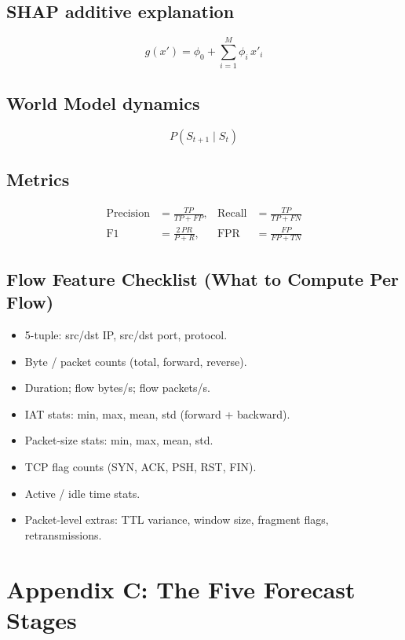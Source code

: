 \documentclass[11pt,a4paper]{article}
\begin{document}
\subsection*{SHAP additive explanation}
\begin{equation*}
g(x') = \phi_0 + \sum_{i=1}^{M} \phi_i \, x'_i
\end{equation*}

\subsection*{World Model dynamics}
\begin{equation*}
P(S_{t+1} \mid S_t)
\end{equation*}

\subsection*{Metrics}
\begin{align*}
\text{Precision} &= \frac{TP}{TP+FP}, &
\text{Recall} &= \frac{TP}{TP+FN}\\[0.3em]
\text{F1} &= \frac{2\,PR}{P+R}, &
\text{FPR} &= \frac{FP}{FP+TN}
\end{align*}

\subsection*{Flow Feature Checklist (What to Compute Per Flow)}
\begin{itemize}[leftmargin=1.6em,itemsep=1pt]
  \item 5-tuple: src/dst IP, src/dst port, protocol.
  \item Byte / packet counts (total, forward, reverse).
  \item Duration; flow bytes/s; flow packets/s.
  \item IAT stats: min, max, mean, std (forward + backward).
  \item Packet-size stats: min, max, mean, std.
  \item TCP flag counts (SYN, ACK, PSH, RST, FIN).
  \item Active / idle time stats.
  \item Packet-level extras: TTL variance, window size, fragment flags, retransmissions.
\end{itemize}

\section*{Appendix C: The Five Forecast Stages}
\end{document}
